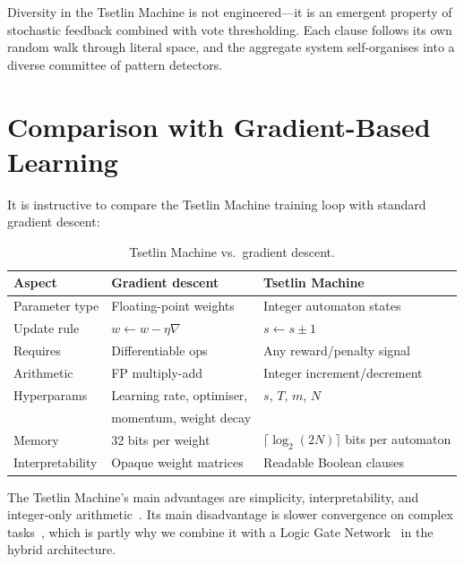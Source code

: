 \begin{keyinsight}
Diversity in the Tsetlin Machine is not engineered---it is an emergent
property of stochastic feedback combined with vote thresholding. Each
clause follows its own random walk through literal space, and the
aggregate system self-organises into a diverse committee of pattern
detectors.
\end{keyinsight}


\section{Comparison with Gradient-Based Learning}
\label{sec:tm-vs-gradient}

It is instructive to compare the Tsetlin Machine training loop with
standard gradient descent:

\begin{table}[htbp]
\centering
\caption{Tsetlin Machine vs.\ gradient descent.}
\label{tab:tm-vs-gd}
\begin{tabular}{@{}lll@{}}
  \toprule
  \textbf{Aspect} & \textbf{Gradient descent} & \textbf{Tsetlin Machine} \\
  \midrule
  Parameter type & Floating-point weights & Integer automaton states \\
  Update rule & $w \leftarrow w - \eta \nabla$ & $s \leftarrow s \pm 1$ \\
  Requires & Differentiable ops & Any reward/penalty signal \\
  Arithmetic & FP multiply-add & Integer increment/decrement \\
  Hyperparams & Learning rate, optimiser, & $s$, $T$, $m$, $N$ \\
   & momentum, weight decay & \\
  Memory & 32 bits per weight & $\lceil \log_2(2N) \rceil$ bits per automaton \\
  Interpretability & Opaque weight matrices & Readable Boolean clauses \\
  \bottomrule
\end{tabular}
\end{table}

The Tsetlin Machine's main advantages are simplicity, interpretability,
and integer-only arithmetic~\cite{wheeldon2020pervasive}. Its main disadvantage is slower convergence
on complex tasks~\cite{zhang2021convergence}, which is partly why we combine it with a Logic Gate
Network~\cite{petersen2022difflogic} in the hybrid architecture.


